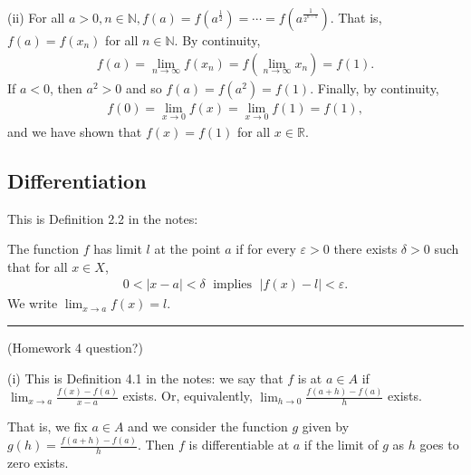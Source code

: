 \documentclass[letterpaper,10pt,english]{jupyterBook}
\begin{document}
\sphinxAtStartPar
(ii) For all \(a>0, n\in\mathbb{N}, f(a) = f\left(a^{\frac{1}{2}}\right) = \cdots = f\left(a^{\frac{1}{2^{n-1}}}\right)\). That is, \(f(a)=f(x_n)\) for all \(n\in\mathbb{N}\). By continuity,
\begin{equation*}
\begin{split}
f(a) = \lim_{n\rightarrow\infty} f(x_n) = f\left(\lim_{n\rightarrow\infty} x_n\right) = f(1).
\end{split}
\end{equation*}
\sphinxAtStartPar
If \(a<0\), then \(a^2>0\) and so \(f(a)=f\left(a^2\right)=f(1)\). Finally, by continuity,
\begin{equation*}
\begin{split}
f(0)=\lim_{x\rightarrow 0}f(x) = \lim_{x\rightarrow 0}f(1) = f(1),
\end{split}
\end{equation*}
\sphinxAtStartPar
and we have shown that \(f(x)=f(1)\) for all \(x\in\mathbb{R}\).


\subsection{Differentiation}
\label{\detokenize{Solutions-full:differentiation}}\label{\detokenize{Solutions-full:ch4sol}}
\sphinxAtStartPar
{\hyperref[\detokenize{Problems:id37}]{}} This is Definition 2.2 in the notes:

The function \(f\) has limit \(l\) at the point \(a\) if for every \(\varepsilon>0\) there exists \(\delta>0\) such that for all \(x\in X\),
\begin{equation*}
\begin{split}
0<|x-a|<\delta \; \text{ implies } \; |f(x)-l|<\varepsilon.
\end{split}
\end{equation*}
\sphinxAtStartPar
We write \(\lim_{x\to a}f(x)=l\).


\bigskip\hrule\bigskip


\sphinxAtStartPar
{\hyperref[\detokenize{Problems:id38}]{}} (Homework 4 question?)

\sphinxAtStartPar
(i) This is Definition 4.1 in the notes: we say that \(f\) is  at \(a \in A\) if \( \lim_{x \rightarrow a}\frac{f(x) - f(a)}{x - a}\) exists. Or, equivalently, \( \lim_{h \rightarrow 0}\frac{f(a +h) - f(a)}{h}\) exists.

That is, we fix \(a\in A\) and we consider the function \(g\) given by \(g(h)=\frac{f(a +h) - f(a)}{h}\). Then \(f\) is differentiable at \(a\) if the limit of \(g\) as \(h\) goes to zero exists.
\end{document}
